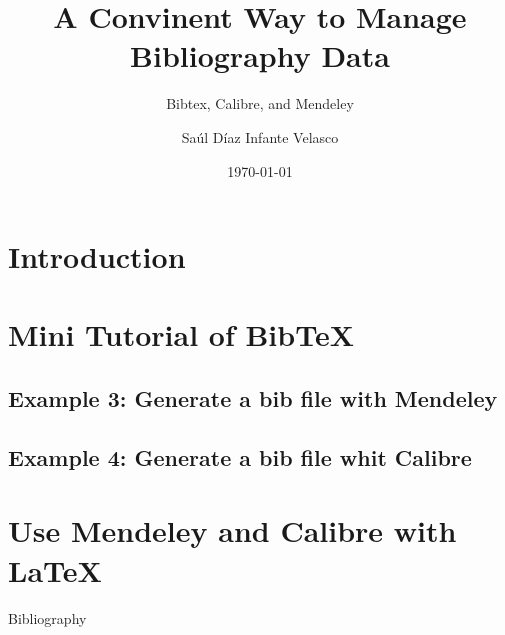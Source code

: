 \documentclass[hyperref={pdfpagelabels=false},usepdftitle=false]{beamer}
\begin{document}
	\title{A Convinent Way to Manage Bibliography Data}
	\subtitle{Bibtex, Calibre, and Mendeley}
	\author{Sa\'ul D\'iaz Infante Velasco}
	\date{\today}	
	\frame{\titlepage}
	\AtBeginSection[]{
    	\InsertToC[sections={\thesection}]  %
	}
	\section{Introduction}
		
		
	\section{Mini Tutorial of Bib\TeX}
	\subsection{Example 3: Generate a bib file with Mendeley}
	\subsection{Example 4: Generate a bib file whit Calibre}
	\section{Use Mendeley and Calibre with \LaTeX}
	\begin{frame}{Bibliography}
		\nocite{*}
		\printbibliography 
	\end{frame}
\end{document}
